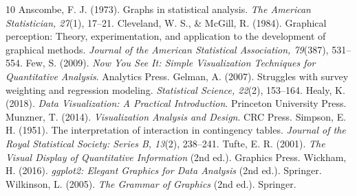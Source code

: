 \documentclass[12pt,a4paper]{article}
\begin{document}
\begin{thebibliography}{10}
 Anscombe, F. J. (1973). Graphs in statistical analysis. \emph{The American Statistician, 27}(1), 17--21.
 Cleveland, W. S., \& McGill, R. (1984). Graphical perception: Theory, experimentation, and application to the development of graphical methods. \emph{Journal of the American Statistical Association, 79}(387), 531--554.
 Few, S. (2009). \emph{Now You See It: Simple Visualization Techniques for Quantitative Analysis}. Analytics Press.
 Gelman, A. (2007). Struggles with survey weighting and regression modeling. \emph{Statistical Science, 22}(2), 153--164.
 Healy, K. (2018). \emph{Data Visualization: A Practical Introduction}. Princeton University Press.
 Munzner, T. (2014). \emph{Visualization Analysis and Design}. CRC Press.
 Simpson, E. H. (1951). The interpretation of interaction in contingency tables. \emph{Journal of the Royal Statistical Society: Series B, 13}(2), 238--241.
 Tufte, E. R. (2001). \emph{The Visual Display of Quantitative Information} (2nd ed.). Graphics Press.
 Wickham, H. (2016). \emph{ggplot2: Elegant Graphics for Data Analysis} (2nd ed.). Springer.
 Wilkinson, L. (2005). \emph{The Grammar of Graphics} (2nd ed.). Springer.
\end{thebibliography}
\end{document}
